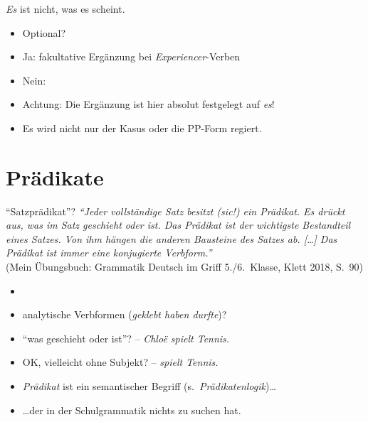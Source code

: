 \begin{frame}
  {\textit{Es} ist nicht, was es scheint.}
  \begin{exe}
    \ex
    \begin{xlist}
    \end{xlist}
  \end{exe}
  \pause
  \begin{itemize}[<+->]
    \item Optional?
    \item Ja: \alert{fakultative Ergänzung bei \textit{Experiencer}-Verben}
    \item Nein: 
      \Halbzeile
    \item Achtung: Die Ergänzung ist hier absolut festgelegt auf \textit{es}!
    \item Es wird nicht nur der Kasus oder die PP-Form regiert.
  \end{itemize}
\end{frame}


\section{Prädikate}

\begin{frame}
  {"`Satzprädikat"'?}
  \pause
  \textit{"`Jeder vollständige Satz besitzt (sic!) ein Prädikat. Es drückt aus, was im Satz geschieht oder ist. Das Prädikat ist der wichtigste Bestandteil eines Satzes. Von ihm hängen die anderen Bausteine des Satzes ab. [\ldots] Das Prädikat ist immer eine konjugierte Verbform."'}\\
  \pause\Viertelzeile
  {\small (Mein Übungsbuch: Grammatik Deutsch im Griff 5.\slash 6.~Klasse, Klett 2018, S.~90)}
  \pause
  \Halbzeile
  \begin{itemize}[<+->]
    \item {}
    \item analytische Verbformen (\textit{geklebt haben durfte})?
    \item "`was geschieht oder ist"'? -- \textit{Chloë spielt Tennis.}
    \item OK, vielleicht ohne Subjekt? -- \textit{spielt Tennis.}
      \Halbzeile
    \item \textit{Prädikat} ist ein \alert{semantischer Begriff} (s.~\textit{Prädikatenlogik})\ldots
    \item \ldots der \alert{in der Schulgrammatik nichts zu suchen hat}.
  \end{itemize}
\end{frame}

